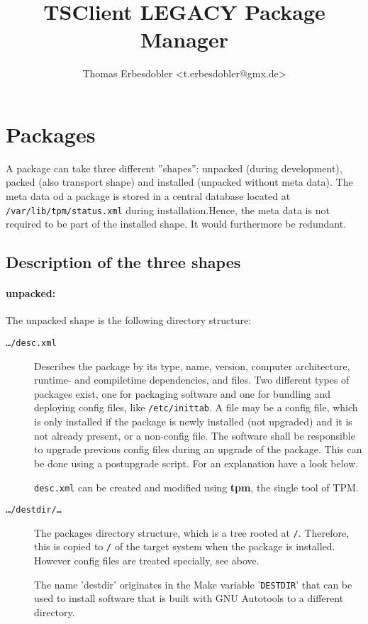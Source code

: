 \documentclass[a4paper]{article}
\title{TSClient LEGACY Package Manager}
\author{Thomas Erbesdobler <t.erbesdobler@gmx.de>}
\newcommand{\file}[1]{\texttt{#1}}
\newcommand{\program}[1]{\textbf{#1}}
\newcommand{\variable}[1]{'\texttt{#1}'}
\begin{document}
	\maketitle
	\tableofcontents
	
	\section{Packages}
	\label{sec:packages}
	
	A package can take three different ''shapes'': unpacked (during development), packed (also transport shape) and installed (unpacked without meta data). The meta data od a package is stored in a central database located at \file{/var/lib/tpm/status.xml} during installation.Hence, the meta data is not required to be part of the installed shape. It would furthermore be redundant.
	
	\subsection{Description of the three shapes}
	\label{sec:description_of_the_three_shapes}
	
	\paragraph{unpacked:}
	The unpacked shape is the following directory structure:
	\begin{description}
		\item[\file{\dots/desc.xml}] Describes the package by its type, name, version, computer architecture, runtime- and compiletime dependencies, and files. Two different types of packages exist, one for packaging software and one for bundling and deploying config files, like \file{/etc/inittab}. A file may be a config file, which is only installed if the package is newly installed (not upgraded) and it is not already present, or a non-config file. The software shall be responsible to upgrade previous config files during an upgrade of the package. This can be done using a postupgrade script. For an explanation have a look below.
		
		\file{desc.xml} can be created and modified using \program{tpm}, the single tool of TPM.
		
		\item[\file{\dots/destdir/\dots}] The packages directory structure, which is a tree rooted at \file{/}. Therefore, this is copied to \file{/} of the target system when the package is installed. However config files are treated specially, see above.
		
		The name 'destdir' originates in the Make variable \variable{DESTDIR} that can be used to install software that is built with GNU Autotools to a different directory.
	\end{description}
\end{document}
